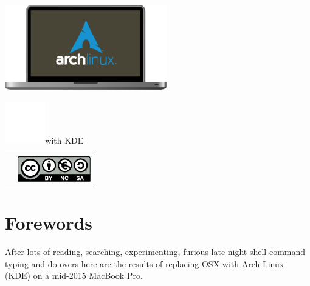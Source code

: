 \vspace*{\fill}
\includegraphics[height=10em]{img/ArchMBP.pdf}\linebreak
\begin{mdframed}[style=titlebox]
	\centering
	\begin{Huge}
		\par
	\end{Huge}
\end{mdframed}
\vspace*{2em}
\includegraphics[height=5em]{img/kde-logo.pdf}with KDE\par
\vspace*{\fill}
\begin{tabularx}{0.95\textwidth}{lR}
	& \includegraphics[height=3em]{../common/licenses/by-nc-sa_eu.pdf}
\end{tabularx}
\vspace*{2em}

\setcounter{page}{1}
\pagecolor{white}
\color{dark}
\normalsize\justify
\tableofcontents
\clearpage

\clearpage
\section{Forewords}

After lots of reading, searching, experimenting, furious late-night shell command typing and do-overs here are the results of replacing OSX with Arch Linux (KDE) on a mid-2015 MacBook Pro. 

